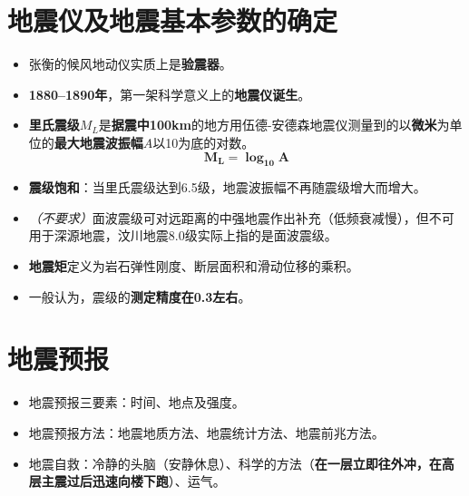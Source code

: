 \documentclass[twoside,titlepage,hyperref,UTF8,12pt]{ctexart}
\begin{document}
\section{地震仪及地震基本参数的确定}
\begin{itemize}
    \item 张衡的候风地动仪实质上是\textbf{验震器}。
    \item \textbf{1880--1890年}，第一架科学意义上的\textbf{地震仪诞生}。
    \item \textbf{里氏震级}$M_L$是\textbf{据震中100km}的地方用伍德-安德森地震仪测量到的以\textbf{微米}为单位的\textbf{最大地震波振幅}$A$以10为底的对数。
        \begin{equation}
            \bm{M_L = \log_{10}A}
        \end{equation}
    \item \textbf{震级饱和}：当里氏震级达到6.5级，地震波振幅不再随震级增大而增大。
    \item \textit{（不要求）}面波震级可对远距离的中强地震作出补充（低频衰减慢），但不可用于深源地震，汶川地震8.0级实际上指的是面波震级。
    \item \textbf{地震矩}定义为岩石弹性刚度、断层面积和滑动位移的乘积。
    \item 一般认为，震级的\textbf{测定精度在0.3左右}。
\end{itemize}
\section{地震预报}
\begin{itemize}
    \item 地震预报三要素：时间、地点及强度。
    \item 地震预报方法：地震地质方法、地震统计方法、地震前兆方法。
    \item 地震自救：冷静的头脑（安静休息）、科学的方法（\textbf{在一层立即往外冲，在高层主震过后迅速向楼下跑}）、运气。
\end{itemize}
\end{document}
